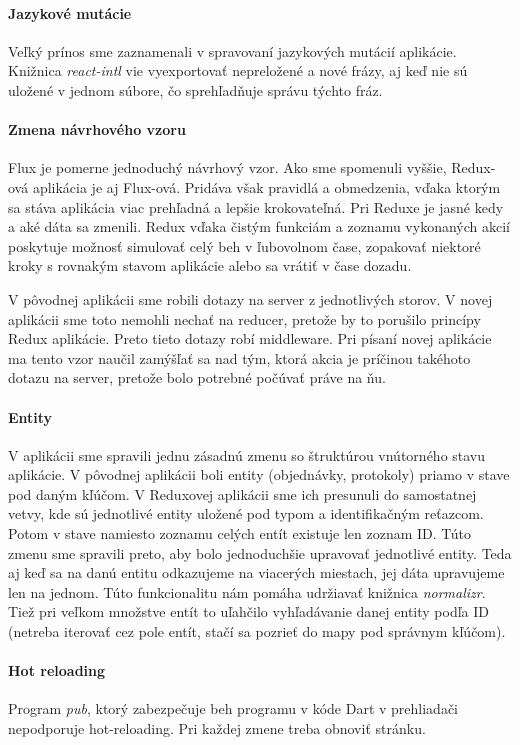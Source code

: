 \paragraph{Jazykové mutácie}
Veľký prínos sme zaznamenali v spravovaní jazykových mutácií aplikácie. Knižnica \emph{react-intl} vie vyexportovať nepreložené a nové frázy, aj keď nie sú uložené v jednom súbore, čo sprehľadňuje správu týchto fráz.

\paragraph{Zmena návrhového vzoru}
Flux je pomerne jednoduchý návrhový vzor. Ako sme spomenuli vyššie, Redux-ová aplikácia je aj Flux-ová. Pridáva však pravidlá a obmedzenia, vďaka ktorým sa stáva aplikácia viac prehľadná a lepšie krokovateľná. Pri Reduxe je jasné kedy a aké dáta sa zmenili. Redux vďaka čistým funkciám a zoznamu vykonaných akcií poskytuje možnosť simulovať celý beh v ľubovolnom čase, zopakovať niektoré kroky s rovnakým stavom aplikácie alebo sa vrátiť v čase dozadu.

V pôvodnej aplikácii sme robili dotazy na server z jednotlivých storov. V novej aplikácii sme toto nemohli nechať na reducer, pretože by to porušilo princípy Redux aplikácie. Preto tieto dotazy robí middleware. Pri písaní novej aplikácie ma tento vzor naučil zamýšľať sa nad tým, ktorá akcia je príčinou takéhoto dotazu na server, pretože bolo potrebné počúvať práve na ňu.

\paragraph{Entity}%
V aplikácii sme spravili jednu zásadnú zmenu so štruktúrou vnútorného stavu aplikácie. V pôvodnej aplikácii boli entity (objednávky, protokoly) priamo v stave pod daným kľúčom. 
V Reduxovej aplikácii sme ich presunuli do samostatnej vetvy, kde sú jednotlivé entity uložené pod typom a identifikačným reťazcom. Potom v stave namiesto zoznamu celých entít existuje len zoznam ID. 
Túto zmenu sme spravili preto, aby bolo jednoduchšie upravovať jednotlivé entity. Teda aj keď sa na danú entitu odkazujeme na viacerých miestach, jej dáta upravujeme len na jednom. Túto funkcionalitu nám pomáha udržiavať knižnica \emph{normalizr}.
Tiež pri veľkom množstve entít to uľahčilo vyhľadávanie danej entity podľa ID (netreba iterovať cez pole entít, stačí sa pozrieť do mapy pod správnym kľúčom).

\paragraph{Hot reloading}%
Program \emph{pub}, ktorý zabezpečuje beh programu v kóde Dart v prehliadači nepodporuje hot-reloading. Pri každej zmene treba obnoviť stránku.

